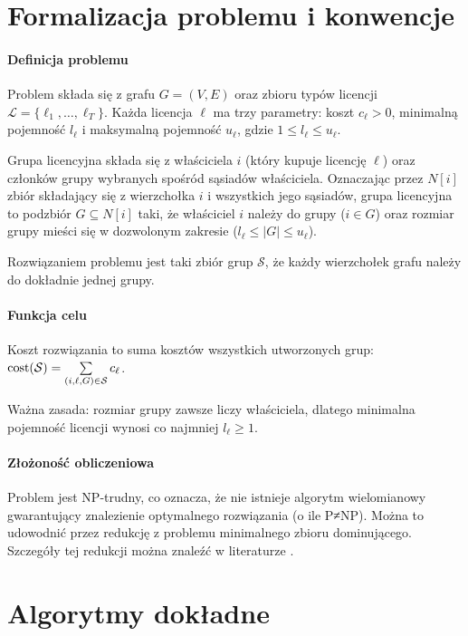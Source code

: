 \section{Formalizacja problemu i konwencje}\label{sec:model-formal}

\paragraph{Definicja problemu}
Problem składa się z grafu $G=(V,E)$ oraz zbioru typów licencji $\mathcal{L}=\{\ell_1,\dots,\ell_T\}$. Każda licencja $\ell$ ma trzy parametry: koszt $c_\ell>0$, minimalną pojemność $l_\ell$ i maksymalną pojemność $u_\ell$, gdzie $1\le l_\ell\le u_\ell$.

Grupa licencyjna składa się z właściciela $i$ (który kupuje licencję $\ell$) oraz członków grupy wybranych spośród sąsiadów właściciela. Oznaczając przez $N[i]$ zbiór składający się z wierzchołka $i$ i wszystkich jego sąsiadów, grupa licencyjna to podzbiór $G\subseteq N[i]$ taki, że właściciel $i$ należy do grupy ($i\in G$) oraz rozmiar grupy mieści się w dozwolonym zakresie ($l_\ell\le |G|\le u_\ell$).

Rozwiązaniem problemu jest taki zbiór grup $\mathcal{S}$, że każdy wierzchołek grafu należy do dokładnie jednej grupy.

\paragraph{Funkcja celu}
Koszt rozwiązania to suma kosztów wszystkich utworzonych grup: $\operatorname{cost}(\mathcal{S})=\sum\limits_{(i,\ell,G)\in\mathcal{S}} c_\ell$.

Ważna zasada: rozmiar grupy zawsze liczy właściciela, dlatego minimalna pojemność licencji wynosi co najmniej $l_\ell\ge 1$.

\paragraph{Złożoność obliczeniowa}
Problem jest NP-trudny, co oznacza, że nie istnieje algorytm wielomianowy gwarantujący znalezienie optymalnego rozwiązania (o ile P≠NP). Można to udowodnić przez redukcję z problemu minimalnego zbioru dominującego. Szczegóły tej redukcji można znaleźć w literaturze \cite{garey1979,karp1972}.

\section{Algorytmy dokładne}

